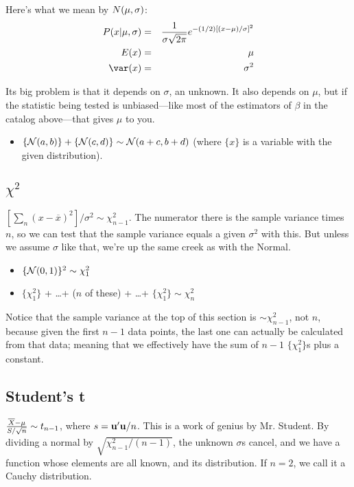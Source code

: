 Here's what we mean by ${\cal}N(\mu,\sigma)$:
\begin{eqnarray}					\label{normal}
P(x|\mu,\sigma)&=&{1\over \sigma\sqrt{2\pi}} e^{-(1/2)[(x-\mu)/\sigma]^2}\\ 
E(x)&=&\mu							\nonumber\\
\var(x)&=&\sigma^2						\nonumber
\end{eqnarray}

Its big problem is that it depends on $\sigma$, an
unknown. It also depends on $\mu$, but if the statistic
being tested is unbiased---like most of the estimators of $\beta$ in the
catalog above---that gives $\mu$ to you.

\begin{itemize}
\item $\{{\cal N} (a,b)\} + \{{\cal N} (c,d)\} \sim {\cal N}
(a+c,b+d)$ (where $\{x\}$ is a variable with the given distribution).
\end{itemize}

\subsection{$\chi^2$} $[\sum_n (x-\overline
x)^2]/\sigma^2\sim \chi^2_{n-1}$. The numerator there is the sample
variance times $n$, so we can test that the sample variance equals a
given $\sigma^2$ with this. But unless we assume $\sigma$ like that,
we're up the same creek as with the Normal.

\begin{itemize}
\item $\{{\cal N} (0,1)\}^2 \sim \chi^2_1$

\item $\{\chi^2_1\}$ + \dots + ($n$ of these) + \dots + $\{\chi^2_1\} \sim \chi^2_n$

\end{itemize}			\label{chisq}

Notice that the sample variance at the top of this section is $\sim
\chi^2_{n-1}$, not $n$, because given the first $n-1$ data points, the
last one can actually be calculated from that data; meaning that we
effectively have the sum of $n-1$ $\{\chi^2_1\}$s plus a constant.

\subsection{Student's t}  ${\overline X - \mu \over S/\sqrt{n}}\sim
t_{n-1}$, where $s={\bf u}'{\bf u}/n$. This is a work of genius by Mr. Student.
By dividing a normal by $\sqrt{\chi^2_{n-1}/(n-1)}$, the unknown
$\sigma$s cancel, and we have a function whose elements are all known,
and its distribution.  If $n=2$, we call it a Cauchy distribution.
\label{tstat}


